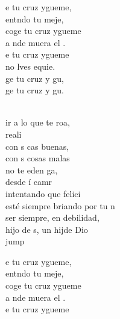\begin{cancion}%
	\begin{chorus}%
	e tu cruz ygueme,  \\
	entndo tu meje, \\
	coge tu cruz ygueme  \\
	a nde muera el . \\
	e tu cruz ygueme  \\
	no lves equie. \\
	ge tu cruz y gu, \\
	ge tu cruz y gu. \\
	\end{chorus}%
	\jump\\
	ir a lo que te roa, \\
	 reali \\
	con s cas buenas, \\
	con s cosas malas \\
	no te eden ga, \\
	desde í camr \\
	intentando que  felici \\
	esté siempre briando por tu n  \\
	 ser siempre, en debilidad, \\
	 hijo de s, un hijde Dio\\jump\\
	\begin{chorus}%
	e tu cruz ygueme,  \\
	entndo tu meje, \\
	coge tu cruz ygueme  \\
	a nde muera el . \\
	e tu cruz ygueme  \\

\end{chorus}
\end{cancion}
